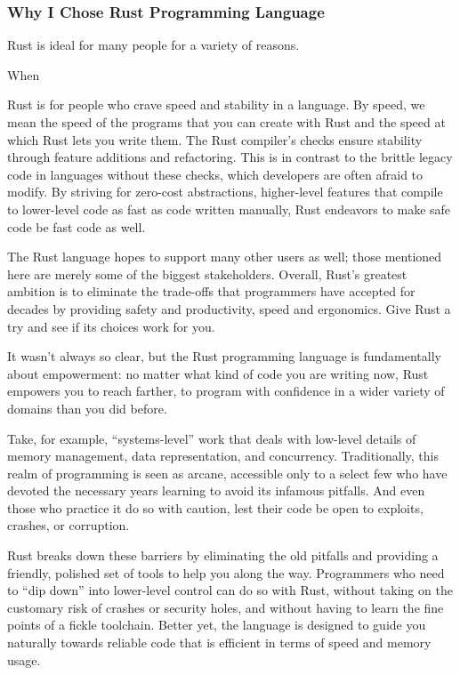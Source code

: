 \subsubsection{Why I Chose Rust Programming Language}

Rust is ideal for many people for a variety of reasons.

When 

Rust is for people who crave speed and stability in a language. By speed, we mean the speed of the programs that you can create with Rust and the speed at which Rust lets you write them. The Rust compiler’s checks ensure stability through feature additions and refactoring. This is in contrast to the brittle legacy code in languages without these checks, which developers are often afraid to modify. By striving for zero-cost abstractions, higher-level features that compile to lower-level code as fast as code written manually, Rust endeavors to make safe code be fast code as well. \cite{steveklabnik2018}

The Rust language hopes to support many other users as well; those mentioned here are merely some of the biggest stakeholders. Overall, Rust’s greatest ambition is to eliminate the trade-offs that programmers have accepted for decades by providing safety and productivity, speed and ergonomics. Give Rust a try and see if its choices work for you. \cite{steveklabnik2018}

It wasn’t always so clear, but the Rust programming language is fundamentally about empowerment: no matter what kind of code you are writing now, Rust empowers you to reach farther, to program with confidence in a wider variety of domains than you did before.

Take, for example, “systems-level” work that deals with low-level details of memory management, data representation, and concurrency. Traditionally, this realm of programming is seen as arcane, accessible only to a select few who have devoted the necessary years learning to avoid its infamous pitfalls. And even those who practice it do so with caution, lest their code be open to exploits, crashes, or corruption.

Rust breaks down these barriers by eliminating the old pitfalls and providing a friendly, polished set of tools to help you along the way. Programmers who need to “dip down” into lower-level control can do so with Rust, without taking on the customary risk of crashes or security holes, and without having to learn the fine points of a fickle toolchain. Better yet, the language is designed to guide you naturally towards reliable code that is efficient in terms of speed and memory usage.


